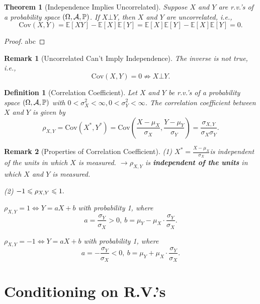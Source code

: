 \documentclass[openany,12pt]{book}
\newtheorem{theorem}{Theorem}[chapter]
\newtheorem{remark}{Remark}[chapter]
\newtheorem{definition}{Definition}[chapter]
\begin{document}
\begin{theorem}[Independence Implies Uncorrelated]
Suppose $X$ and $Y$ are r.v.'s of a probability space $(\Omega,\mathcal{A},\mathbb{P})$. If $X\bot Y$, then $X$ and $Y$ are uncorrelated, i.e.,
\[\mathrm{Cov}(X,Y) = \mathbb{E}[XY] - \mathbb{E}[X] \mathbb{E}[Y] = \mathbb{E}[X] \mathbb{E}[Y] - \mathbb{E}[X] \mathbb{E}[Y] = 0.\]
\vspace{0.01cm}
\end{theorem}

\begin{proof}
  abc
\end{proof}

\begin{remark}[Uncorrelated Can't Imply Independence]
The inverse is not true, i.e.,
\[\mathrm{Cov}(X,Y) = 0 \nRightarrow X\bot Y.\]
\vspace{0.01cm}
\end{remark}

\begin{definition}[Correlation Coefficient]
Let $X$ and $Y$ be r.v.'s of a probability space $(\Omega,\mathcal{A},\mathbb{P})$ with
$0 < \sigma_{X}^{2} < \infty,0 < \sigma_{Y}^{2} < \infty$. The correlation coefficient between $X$ and $Y$ is given by
\[\rho_{X,Y} = \mathrm{Cov}\left( X^{*},Y^{*} \right) = \mathrm{Cov}\left( \frac{X - \mu_{X}}{\sigma_{X}},\frac{Y - \mu_{Y}}{\sigma_{Y}} \right) = \frac{\sigma_{X,Y}}{\sigma_{X}\sigma_{Y}}.\]
\end{definition}

\begin{remark}[Properties of Correlation Coefficient]

(1) $X^{*} = \frac{X - \mu_{X}}{\sigma_{X}}$is independent of the units in which $X$ is measured. $\to \rho_{X,Y}$ is \textbf{independent of the units} in which $X$ and $Y$ is measured.

(2) $- 1 \leqslant \rho_{X,Y} \leqslant 1.$

$\rho_{X,Y} = 1 \Leftrightarrow Y = aX + b$ with probability 1, where
\[a = \frac{\sigma_{Y}}{\sigma_{X}} > 0,\ b = \mu_{Y} - \mu_{X} \cdot \frac{\sigma_{Y}}{\sigma_{X}}.\]

$\rho_{X,Y} =- 1 \Leftrightarrow Y = aX + b$ with probability 1, where
\[a = - \frac{\sigma_{Y}}{\sigma_{X}} < 0,\ b = \mu_{Y} + \mu_{X} \cdot \frac{\sigma_{Y}}{\sigma_{X}}.\]
\end{remark}

\section{Conditioning on R.V.'s}
\end{document}

